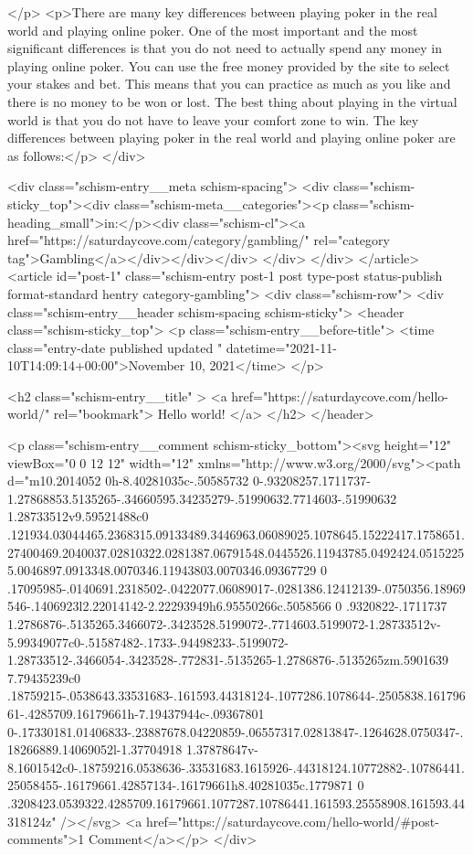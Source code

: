 {</p>
<p>There are many key differences between playing poker in the real world and playing online poker. One of the most important and the most significant differences is that you do not need to actually spend any money in playing online poker. You can use the free money provided by the site to select your stakes and bet. This means that you can practice as much as you like and there is no money to be won or lost. The best thing about playing in the virtual world is that you do not have to leave your comfort zone to win. The key differences between playing poker in the real world and playing online poker are as follows:</p>
		</div>

		<div class="schism-entry__meta schism-spacing">			<div class="schism-sticky_top"><div class="schism-meta__categories"><p class="schism-heading_small">in:</p><div class="schism-cl"><a href="https://saturdaycove.com/category/gambling/" rel="category tag">Gambling</a></div></div></div>		</div>
	</div>
</article>
<article id="post-1" class="schism-entry post-1 post type-post status-publish format-standard hentry category-gambling">
	<div class="schism-row">		<div class="schism-entry__header schism-spacing schism-sticky">			<header class="schism-sticky_top">				<p class="schism-entry__before-title">
					<time class="entry-date published updated " datetime="2021-11-10T14:09:14+00:00">November 10, 2021</time>				</p>

				<h2 class="schism-entry__title" >
					<a href="https://saturdaycove.com/hello-world/" rel="bookmark">
						Hello world!					</a>
				</h2>
			</header>

			<p class="schism-entry__comment schism-sticky_bottom"><svg height="12" viewBox="0 0 12 12" width="12" xmlns="http://www.w3.org/2000/svg"><path d="m10.2014052 0h-8.40281035c-.50585732 0-.93208257.1711737-1.27868853.5135265-.34660595.34235279-.51990632.7714603-.51990632 1.28733512v9.59521488c0 .121934.03044465.2368315.09133489.3446963.06089025.1078645.15222417.1758651.27400469.2040037.02810322.0281387.06791548.0445526.11943785.0492424.05152255.0046897.0913348.0070346.11943803.0070346.09367729 0 .17095985-.0140691.2318502-.0422077.06089017-.0281386.12412139-.0750356.18969546-.1406923l2.22014142-2.22293949h6.95550266c.5058566 0 .9320822-.1711737 1.2786876-.5135265.3466072-.3423528.5199072-.7714603.5199072-1.28733512v-5.99349077c0-.51587482-.1733-.94498233-.5199072-1.28733512-.3466054-.3423528-.772831-.5135265-1.2786876-.5135265zm.5901639 7.79435239c0 .18759215-.0538643.33531683-.161593.44318124-.1077286.1078644-.2505838.16179661-.4285709.16179661h-7.19437944c-.09367801 0-.17330181.01406833-.23887678.04220859-.06557317.02813847-.1264628.0750347-.18266889.14069052l-1.37704918 1.37878647v-8.1601542c0-.18759216.0538636-.33531683.1615926-.44318124.10772882-.10786441.25058455-.16179661.42857134-.16179661h8.40281035c.1779871 0 .3208423.0539322.4285709.16179661.1077287.10786441.161593.25558908.161593.44318124z" /></svg> <a href="https://saturdaycove.com/hello-world/#post-comments">1 Comment</a></p>		</div>

}
